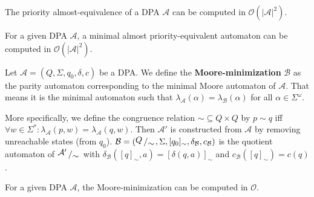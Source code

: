 \begin{lem}
	The priority almost-equivalence of a DPA $\mathcal{A}$ can be computed in $\mathcal{O}(|\mathcal{A}|^2)$.
\end{lem}

\begin{theorem}
	For a given DPA $\mathcal{A}$, a minimal almost priority-equivalent automaton can be computed in $\mathcal{O}(|\mathcal{A}|^2)$. 
\end{theorem}
	


\begin{defn}
	Let $\mathcal{A} = (Q, \Sigma, q_0, \delta, c)$ be a DPA. We define the \textbf{Moore-minimization} $\mathcal{B}$ as the parity automaton corresponding to the minimal Moore automaton of $\mathcal{A}$. That means it is the minimal automaton such that $\lambda_\mathcal{A}(\alpha) = \lambda_\mathcal{B}(\alpha)$ for all $\alpha \in \Sigma^\omega$.
	
	More specifically, we define the congruence relation $\sim \subseteq Q \times Q$ by $p \sim q$ iff $\forall w \in \Sigma^*: \lambda_\mathcal{A}(p, w) = \lambda_\mathcal{A}(q, w)$. Then $\mathcal{A}'$ is constructed from $\mathcal{A}$ by removing unreachable states (from $q_0$). $\mathcal{B} = (\bigslant{Q}{\sim}, \Sigma, [q_0]_\sim, \delta_\mathcal{B}, c_\mathcal{B})$ is the quotient automaton of $\bigslant{\mathcal{A}'}{\sim}$ with $\delta_\mathcal{B}([q]_\sim, a) = [\delta(q, a)]_\sim$ and $c_\mathcal{B}([q]_\sim) = c(q)$.
\end{defn}

\begin{lem}
	For a given DPA $\mathcal{A}$, the Moore-minimization can be computed in $\mathcal{O}$.
\end{lem}






